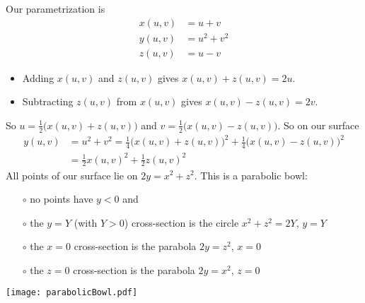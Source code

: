 \begin{solution} 
Our parametrization is
\begin{align*}
x(u,v) &= u+v \\
y(u,v) &= u^2+v^2 \\
z(u,v) &= u-v
\end{align*}
\begin{itemize}
\item
Adding $x(u,v)$ and $z(u,v)$ gives $x(u,v)+z(u,v) = 2u$. 
\item
Subtracting $z(u,v)$ from $x(u,v)$ gives $x(u,v)-z(u,v) = 2v$.
\end{itemize}
So $u=\frac{1}{2}\big(x(u,v)+z(u,v)\big)$ and
        $v=\frac{1}{2}\big(x(u,v)-z(u,v)\big)$. So on our surface
\begin{align*}
y(u,v) &= u^2+v^2 = \frac{1}{4}\big(x(u,v)+z(u,v)\big)^2
                  +\frac{1}{4}\big(x(u,v)-z(u,v)\big)^2 \\
 &= \frac{1}{2} x(u,v)^2 + \frac{1}{2} z(u,v)^2
\end{align*}
All points of our surface lie on $2y= x^2+z^2$. This is a parabolic bowl:
\begin{itemize}\itemsep1pt \parskip0pt  %
\item[$\circ$]
no points have $y<0$ and
\item[$\circ$]
the $y=Y$ (with $Y> 0$) cross-section is the circle
$x^2+z^2=2Y$, $y=Y$
\item[$\circ$]
the $x=0$ cross-section is the parabola $2y=z^2$, $x=0$
\item[$\circ$]
the $z=0$ cross-section is the parabola $2y=x^2$, $z=0$
\end{itemize}

\begin{center}
       \texttt{[image: parabolicBowl.pdf]}
\end{center}

\end{solution}


\subsection*{\Procedural}



